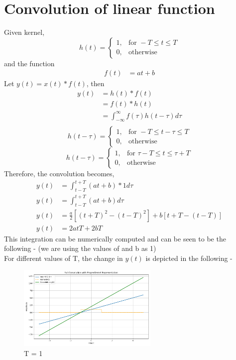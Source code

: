 \section{Convolution of linear function}

Given kernel, 
\[
h(t) =
\begin{cases}
1, & \text{for } -T \leq t \leq T \\
0, & \text{otherwise}
\end{cases}
\]
and the function 
\begin{align*}
f(t) &= at+b
\end{align*}
Let $y(t) = x(t) * f(t)$, then
\begin{align*}
	y(t) &= h(t) * f(t) \\
             &= f(t) * h(t) \\
             &= \int_{-\infty}^{\infty} f(\tau) h(t - \tau) d \tau \\
\end{align*}
\[
h(t - \tau) =
\begin{cases}
1, & \text{for } -T \leq t - \tau \leq T \\
0, & \text{otherwise}
\end{cases}
\]
\[
h(t - \tau) =
\begin{cases}
1, & \text{for } \tau - T \leq t \leq \tau + T \\
0, & \text{otherwise}
\end{cases}
\]
Therefore, the convolution becomes, 
\begin{align*}
	y(t) &= \int_{t - T}^{t + T} (at+b)* 1 d\tau \\
	y(t) &= \int_{t - T}^{t + T}  (at+b)d\tau\\
    y(t) &= \frac{a}{2}[(t+T)^2-(t-T)^2]+b[t+T-(t-T)]\\
    y(t) &= 2atT+2bT
\end{align*}
This integration can be numerically computed and can be seen to be the following - (we are using the values of  and b as 1)\\
\newpage
For different values of T, the change in $y(t)$ is depicted in the following - \\
\begin{figure}[h]
    \centering
    \includegraphics[width=0.6\textwidth]{figsm/1.png}
    \caption{T = 1}
    \label{fig:conv_sinc}
\end{figure}
